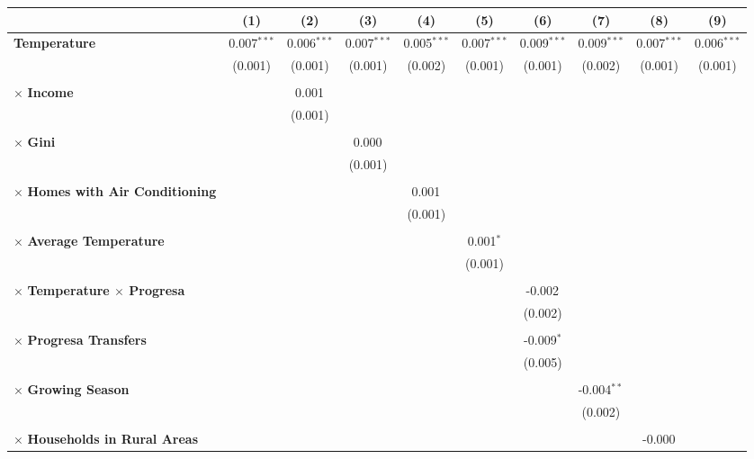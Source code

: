 \begin{tabular}{@{\extracolsep{5pt}}lccccccccc}
\hline
\hline
& (1) & (2) & (3) & (4) & (5) & (6) & (7) & (8) & (9) \\
\hline
\textbf{Temperature} & 0.007$^{***}$ & 0.006$^{***}$ & 0.007$^{***}$ & 0.005$^{***}$ & 0.007$^{***}$ & 0.009$^{***}$ & 0.009$^{***}$ & 0.007$^{***}$ & 0.006$^{***}$ \\
& (0.001) & (0.001) & (0.001) & (0.002) & (0.001) & (0.001) & (0.002) & (0.001) & (0.001) \\
\\
\hspace{4pt} $\times$ \textbf{Income} & & 0.001$^{}$ & & & & & & & \\
& & (0.001) & & & & & & & \\
\\
\hspace{4pt} $\times$ \textbf{Gini} & & & 0.000$^{}$ & & & & & & \\
& & & (0.001) & & & & & & \\
\\
\hspace{4pt} $\times$ \textbf{Homes with Air Conditioning} & & & & 0.001$^{}$ & & & & & \\
& & & & (0.001) & & & & & \\
\\
\hspace{4pt} $\times$ \textbf{Average Temperature} & & & & & 0.001$^{*}$ & & & & \\
& & & & & (0.001) & & & & \\
\\
\hspace{4pt} $\times$ \textbf{Temperature $\times$ Progresa} & & & & & & -0.002$^{}$ & & & \\
& & & & & & (0.002)& & & \\
\\
\hspace{4pt} $\times$ \textbf{Progresa Transfers} & & & & & & -0.009$^{*}$ & & & \\
& & & & & & (0.005) & & & \\
\\
\hspace{4pt} $\times$ \textbf{Growing Season} & & & & & & & -0.004$^{**}$ & & \\
& & & & & & & (0.002) & & \\
\\
\hspace{4pt} $\times$ \textbf{Households in Rural Areas} & & & & & & & & -0.000$^{}$ & \\

\end{tabular}
